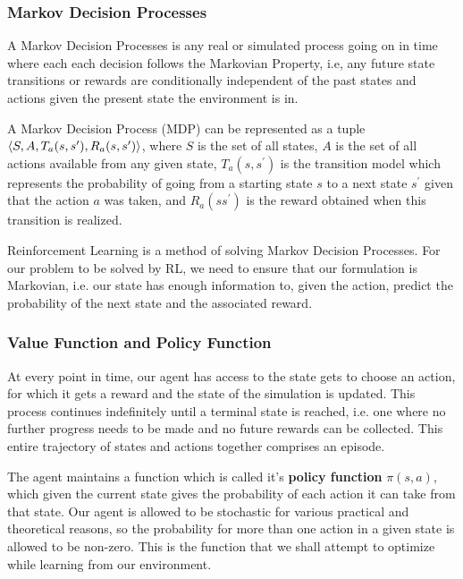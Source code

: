 \subsubsection{Markov Decision Processes}


A Markov Decision Processes is any real or simulated process going on in time where each each decision follows the Markovian Property, i.e, any future state transitions or rewards are conditionally independent of the past states and actions given the present state the environment is in.

A Markov Decision Process (MDP) can be represented as a tuple $\braket{S, A, T_a(s, s^\prime), R_a(s, s^\prime)}$, where $S$ is the set of all states, $A$ is the set of all actions available from any given state, $T_a(s, s^\prime)$ is the transition model which represents the probability of going from a starting state $s$ to a next state $s^\prime$ given that the action $a$ was taken, and $R_a(s s^\prime)$ is the reward obtained when this transition is realized.

Reinforcement Learning is a method of solving Markov Decision Processes. For our problem to be solved by RL, we need to ensure that our formulation is Markovian, i.e. our state has enough information to, given the action, predict the probability of the next state and the associated reward.

\subsubsection{Value Function and Policy Function}

At every point in time, our agent has access to the state gets to choose an action, for which it gets a reward and the state of the simulation is updated. 
This process continues indefinitely until a terminal state is reached, i.e. one where no further progress needs to be made and no future rewards can be collected. This entire trajectory of states and actions together comprises an episode.

The agent maintains a function which is called it's \textbf{policy function} $\pi(s, a)$, which given the current state gives the probability of each action it can take from that state. Our agent is allowed to be stochastic for various practical and theoretical reasons, so the probability for more than one action in a given state is allowed to be non-zero. This is the function that we shall attempt to optimize while learning from our environment.

